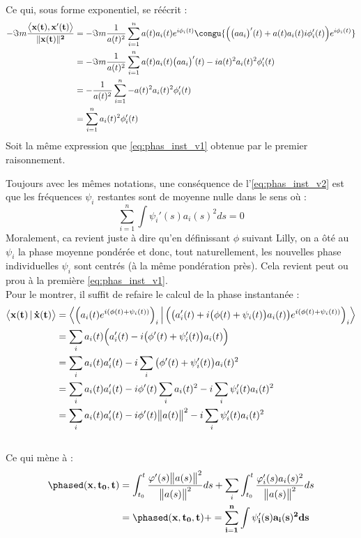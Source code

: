 \\
Ce qui, sous forme exponentiel, se réécrit :
\begin{align*}
	-\Im m\frac{\big\langle \bf{x}(t) , \bf{x}'(t) \big\rangle}{\|\bf{x}(t)\|^2} &= -\Im m\frac{1}{a(t)^2} \sum_{i=1}^n a(t)a_i(t)e^{i\phi_i(t)}\congu{\Big( \big(aa_i\big)'(t) +a(t)a_i(t)i\phi_i'(t)\Big)e^{i\phi_i(t)}} \\
	&= -\Im m\frac{1}{a(t)^2} \sum_{i=1}^n a(t)a_i(t)\big(aa_i\big)'(t) -ia(t)^2a_i(t)^2\phi_i'(t) \\
	&= -\frac{1}{a(t)^2} \sum_{i=1}^n -a(t)^2a_i(t)^2 \phi_i'(t) \\
	&= \sum_{i=1}^n a_i(t)^2 \phi_i'(t)
\end{align*}
Soit la même expression que \eqref{eq:phas_inst_v1} obtenue par le premier raisonnement.
\\
\begin{remarque}
	Toujours avec les mêmes notations, une conséquence de l'\cref{eq:phas_inst_v2} est que les fréquences $\psi_i$ restantes sont de moyenne nulle dans le sens où :
	\begin{equation}\label{eq:sum_esp_null}
		\sum_{i=1}^n \int \psi_i'(s){a_i}(s)^2ds =0
	\end{equation}
	Moralement, ca revient juste à dire qu'en définissant $\phi$ suivant Lilly, on a ôté au $\psi_i$ la phase moyenne pondérée et donc, tout naturellement, les nouvelles phase individuelles $\psi_i$ sont centrés (à la même pondération près). Cela revient peut ou prou à la première \cref{eq:phas_inst_v1}.
	\\
	Pour le montrer, il suffit de refaire le calcul de la phase instantanée :
	\begin{align*}
		\big\langle \bf{x}(t) \,|\, \dot{\bf{x}}(t) \big\rangle &= \Big\langle \Big(a_i(t)e^{i(\phi(t)+\psi_i(t))}\Big)_i \,\Big|\, \Big(\big(a_i'(t)+i\big( \phi(t)+\psi_i(t) \big)a_i(t)\big)e^{i(\phi(t)+\psi_i(t))}\Big)_i \Big\rangle \\
		&= \sum_i a_i(t) \Big(a_i'(t)-i\big(\phi'(t) + \psi_i'(t)\big)a_i(t)\Big) \\
		&= \sum_i a_i(t)a_i'(t)-i\sum_i \big(\phi'(t) + \psi_i'(t)\big)a_i(t)^2 \\
		&= \sum_i a_i(t)a_i'(t)-i \phi'(t)\sum_ia_i(t)^2  - i\sum_i \psi_i'(t)a_i(t)^2 \\
		&= \sum_i a_i(t)a_i'(t)-i \phi'(t)\big\|a(t)\big\|^2  - i\sum_i \psi_i'(t)a_i(t)^2
	\end{align*}
	\\
	Ce qui mène à :
	\begin{align*}
		\phased(\bf{x},t_0,t) &= \int_{t_0}^t \frac{\varphi'(s)\big\|a(s)\big\|^2}{\big\|a(s)\big\|^2} ds  + \sum_i\int_{t_0}^t \frac{\varphi_i'(s)a_i(s)^2}{\big\|a(s)\big\|^2} ds \\
		&=\phased(\bf{x},t_0,t)  + = \sum_{i=1}^n \int \psi_i'(s){a_i}(s)^2ds 
	\end{align*}
\end{remarque}




